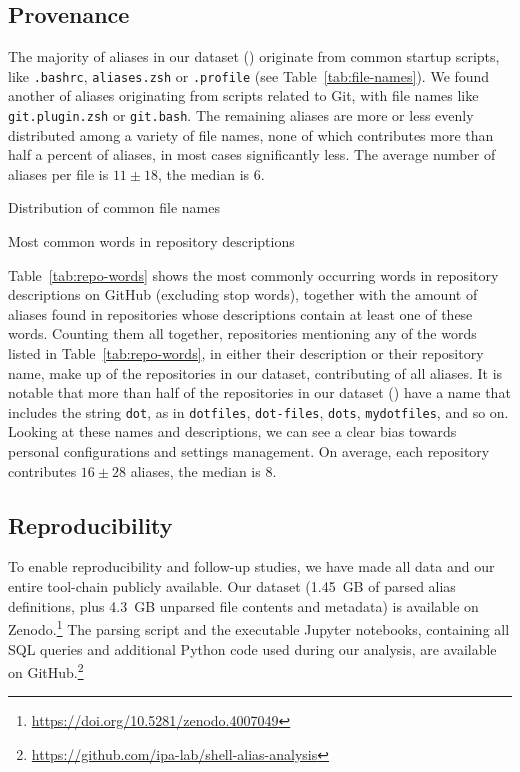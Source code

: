 \documentclass[sigconf,nonacm,screen]{acmart}
\newcommand{\per}[1]{\numprint[\%]{#1}}
\begin{document}
\subsection{Provenance}

The majority of aliases in our dataset (\per{85.74}) originate from common startup scripts, like \texttt{.bashrc}, \texttt{aliases.zsh} or \texttt{.profile} (see Table~\ref{tab:file-names}).
We found another \per{2.78} of aliases originating from scripts related to Git, with file names like \texttt{git.plugin.zsh} or \texttt{git.bash}.
The remaining aliases are more or less evenly distributed among a variety of file names, none of which contributes more than half a percent of aliases, in most cases significantly less.
The average number of aliases per file is $11 \pm 18$, the median is 6.

\begin{table}
	\caption{Distribution of common file names}
	\label{tab:file-names}
	
\end{table}

\begin{table}
	\caption{Most common words in repository descriptions}
	\label{tab:repo-words}
		
\end{table}

Table~\ref{tab:repo-words} shows the most commonly occurring words in repository descriptions on GitHub (excluding stop words), together with the amount of aliases found in repositories whose descriptions contain at least one of these words.
Counting them all together, repositories mentioning any of the words listed in Table~\ref{tab:repo-words}, in either their description or their repository name, make up \per{74.48} of the repositories in our dataset, contributing \per{82.3} of all aliases.
It is notable that more than half of the repositories in our dataset (\per{51.08}) have a name that includes the string \texttt{dot}, as in \texttt{dotfiles}, \texttt{dot-files}, \texttt{dots}, \texttt{mydotfiles}, and so on.
Looking at these names and descriptions, we can see a clear bias towards personal configurations and settings management.
On average, each repository contributes $16 \pm 28$ aliases, the median is 8.

\subsection{Reproducibility}
\label{sec:reproducibility}

To enable reproducibility and follow-up studies, we have made all data and our entire tool-chain publicly available.
Our dataset (1.45~GB of parsed alias definitions, plus 4.3~GB unparsed file contents and metadata) is available on Zenodo.\footnote{\url{https://doi.org/10.5281/zenodo.4007049}}
The parsing script and the executable Jupyter notebooks, containing all SQL queries and additional Python code used during our analysis, are available on GitHub.\footnote{\url{https://github.com/ipa-lab/shell-alias-analysis}}
\end{document}

